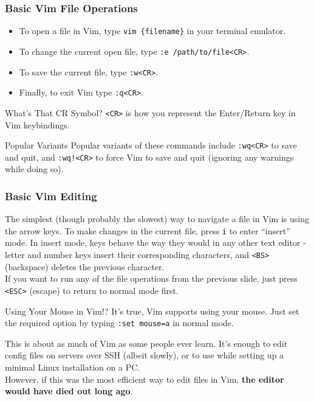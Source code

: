 \documentclass{beamer}
\begin{document}
\begin{frame}[fragile]
    \frametitle{Basic Vim File Operations}
    \small
    \begin{itemize}
	\item To open a file in Vim, type \verb+vim {filename}+ in your terminal emulator.
	\item To change the current open file, type \verb+:e /path/to/file<CR>+.
	\item To save the current file, type \verb+:w<CR>+.
	\item Finally, to exit Vim type \verb+:q<CR>+.
    \end{itemize}
    \begin{block}{What's That CR Symbol?}
	\verb+<CR>+ is how you represent the Enter/Return key in Vim keybindings.
    \end{block}
    \begin{block}{Popular Variants}
	Popular variants of these commands include \verb+:wq<CR>+ to save and quit, and \verb+:wq!<CR>+ to force Vim to save and quit (ignoring any warnings while doing so).
    \end{block}
\end{frame}

\begin{frame}[fragile]
    \frametitle{Basic Vim Editing}
    \small
    The simplest (though probably the slowest) way to navigate a file in Vim is using the arrow keys. To make changes in the current file, press \verb+i+ to enter \enquote{insert} mode. In insert mode, keys behave the way they would in any other text editor - letter and number keys insert their corresponding characters, and \verb+<BS>+ (backspace) deletes the previous character. \\
    \vspace{0.5cm}
    If you want to run any of the file operations from the previous slide, just press \verb+<ESC>+ (escape) to return to normal mode first.
    \begin{block}{Using Your Mouse in Vim!?}
	It's true, Vim supports using your mouse. Just set the required option by typing \verb+:set mouse=a+ in normal mode.
    \end{block}
\end{frame}

\begin{frame}[fragile]
    \small This is about as much of Vim as some people ever learn. It's enough to edit config files on servers over SSH (albeit slowly), or to use while setting up a minimal Linux installation on a PC. \\
    \vspace{0.5cm}
    However, if this was the most efficient way to edit files in Vim, \textbf{the editor would have died out long ago}.
\end{frame}
\end{document}
